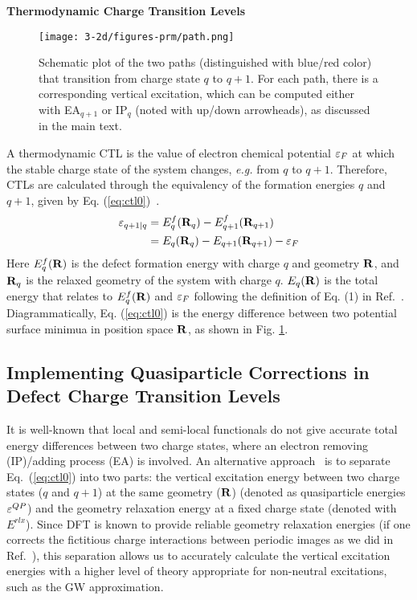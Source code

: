 \textbf{Thermodynamic Charge Transition Levels}

\begin{figure}[t]
\texttt{[image: 3-2d/figures-prm/path.png]}
\caption{Schematic plot of the two paths (distinguished with blue/red color) that transition from charge state $q$ to $q+1$. For each path, there is a corresponding vertical excitation, which can be computed either with EA$_{q+1}$ or IP$_q$ (noted with up/down arrowheads), as discussed in the main text.}  \label{fig:path}
\end{figure}


A thermodynamic CTL is the value of electron chemical potential $\varepsilon_F$ at which the stable charge state of the system changes, \textit{e.g.} from $q$ to $q+1$. Therefore, CTLs are calculated through the equivalency of the formation energies $q$ and $q+1$, given by Eq. (\ref{eq:ctl0})~\cite{freysoldt2014first}.
\begin{align}
\varepsilon_{q+1|q}&=E_q^f(\mathbf{R}_q)-E_{q+1}^f(\mathbf{R}_{q+1}) \nonumber\\
&=E_q(\mathbf{R}_q)-E_{q+1}(\mathbf{R}_{q+1})-\varepsilon_F
\label{eq:ctl0}
\end{align}
Here $E_q^f(\mathbf{R})$ is the defect formation energy with charge $q$ and geometry $\mathbf{R}$, and $\mathbf{R}_q$ is the relaxed geometry of the system with charge $q$. $E_q(\mathbf{R})$ is the total energy that relates to $E_q^f(\mathbf{R})$ and $\varepsilon_F$ following the definition of Eq. (1) in Ref.~\cite{wu2017first}.  Diagrammatically, Eq. (\ref{eq:ctl0}) is the energy difference between two potential  surface minimua in position space $\mathbf{R}$, as shown in Fig. \ref{fig:path}.



\subsection{Implementing Quasiparticle Corrections in Defect Charge Transition Levels}


It is well-known that local and semi-local functionals do not give accurate total energy differences between two charge states, where an electron removing (IP)/adding process (EA) is involved. An alternative approach~\cite{wu2017first} is to separate Eq.~(\ref{eq:ctl0}) into two parts: the vertical excitation energy between two charge states ($q$ and $q+1$) at the same geometry ($\mathbf{R}$) (denoted as quasiparticle energies $\varepsilon^{QP}$) and the geometry relaxation energy at a fixed charge state (denoted with $E^{rlx}$). Since DFT is known to provide reliable geometry relaxation energies (if one corrects the fictitious charge interactions between periodic images as we did in Ref.~\cite{wu2017first}), this separation allows us to accurately calculate the vertical excitation energies with a higher level of theory appropriate for non-neutral excitations, such as the GW approximation.

